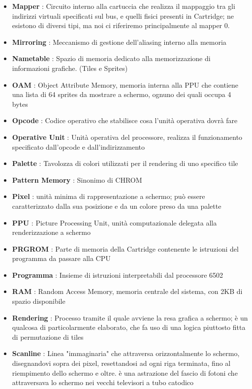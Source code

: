 \documentclass[11pt]{article}
\begin{document}
\begin{itemize}
{}
\item{
	\textbf{Mapper }: Circuito interno alla cartuccia che realizza il mappaggio tra gli indirizzi virtuali specificati sul bus, e quelli fisici presenti in Cartridge; ne esistono di diversi tipi, ma noi ci riferiremo principalmente al mapper 0.
}
\item{
	\textbf{Mirroring }: Meccanismo di gestione dell'aliasing interno alla memoria
}
\item{
	\textbf{Nametable }: Spazio di memoria dedicato alla memorizzazione di informazioni grafiche. (Tiles e Sprites)
}
\item{
	\textbf{OAM }: Object Attribute Memory, memoria interna alla PPU che contiene una lista di 64 sprites da mostrare a schermo, ognuno dei quali occupa 4 bytes
}
\item{
	\textbf{Opcode }: Codice operativo che stabilisce cosa l'unità operativa dovrà fare
}
\item{
	\textbf{Operative Unit }: Unità operativa del processore, realizza il funzionamento specificato dall'opcode e dall'indirizzamento
}
\item{
	\textbf{Palette }: Tavolozza di colori utilizzati per il rendering di uno specifico tile
}
\item{
	\textbf{Pattern Memory }: Sinonimo di CHROM
}
\item{
	\textbf{Pixel }: unità minima di rappresentazione a schermo; può essere caratterizzato dalla sua posizione e da un colore preso da una palette
}
\item{
	\textbf{PPU }: Picture Processing Unit, unità computazionale delegata alla renderizzazione a schermo
}
\item{
	\textbf{PRGROM }: Parte di memoria della Cartridge contenente le istruzioni del programma da passare alla CPU
}
\item{
	\textbf{Programma }: Insieme di istruzioni interpretabili dal processore 6502
}
\item{
	\textbf{RAM }: Random Access Memory, memoria centrale del sistema, con 2KB di spazio disponibile
}
\item{
	\textbf{Rendering }: Processo tramite il quale avviene la resa grafica a schermo; è un qualcosa di particolarmente elaborato, che fa uso di una logica piuttosto fitta di permutazione di tiles 
}
\item{
	\textbf{Scanline }: Linea "immaginaria" che attraversa orizzontalmente lo schermo, disegnandovi sopra dei pixel, resettandosi ad ogni riga terminata, fino al riempimento dello schermo e oltre. è una astrazione del fascio di fotoni che attraversava lo schermo nei vecchi televisori a tubo catodico
}
\end{itemize}
\end{document}
